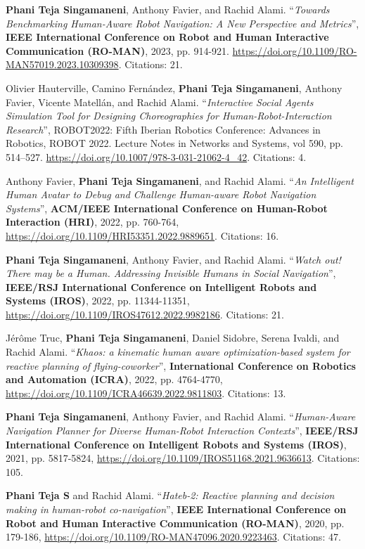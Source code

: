 \documentclass[11pt]{article}
\newcounter{descenum}
\newenvironment{descenumerate}[2]{%
  \setcounter{descenum}{#2}%
  \begin{enumerate}[
    topsep=0pt,
    itemsep=3pt,
    partopsep=0pt,
    parsep=0pt,
    label={[#1\arabic{descenum}]}
  ]
}{
  \end{enumerate}
}
\newcommand{\descitem}{%
  \item
  \addtocounter{descenum}{-1}
}
\newcommand{\bt}[1]{{\textbf{\color{teal} #1}}}
\begin{document}
\begin{descenumerate}{C}{22}
    \descitem \label{new_metrics} {\textbf{Phani Teja Singamaneni}, Anthony Favier, and Rachid Alami. ``\textit{Towards Benchmarking Human-Aware Robot Navigation: A New Perspective and Metrics}'', \bt{IEEE International Conference on Robot and Human Interactive Communication (RO-MAN)}, 2023, pp. 914-921. \url{https://doi.org/10.1109/RO-MAN57019.2023.10309398}.} Citations: 21.
    
    \descitem \label{imhus1} {Olivier Hauterville, Camino Fernández, \textbf{Phani Teja Singamaneni}, Anthony Favier, Vicente Matellán, and Rachid Alami. ``\textit{Interactive Social Agents Simulation Tool for Designing Choreographies for Human-Robot-Interaction Research}'', ROBOT2022: Fifth Iberian Robotics Conference: Advances in Robotics, ROBOT 2022. Lecture Notes in Networks and Systems, vol 590, pp. 514–527. \url{https://doi.org/10.1007/978-3-031-21062-4_42}.} Citations: 4.

    \descitem\label{inhus1} {Anthony Favier, \textbf{Phani Teja Singamaneni}, and Rachid Alami. ``\textit{An Intelligent Human Avatar to Debug and Challenge Human-aware Robot Navigation Systems}'', \bt{ACM/IEEE International Conference on Human-Robot Interaction (HRI)}, 2022, pp. 760-764, \url{https://doi.org/10.1109/HRI53351.2022.9889651}.} Citations: 16.
        
    \descitem \label{cohan3} {\textbf{Phani Teja Singamaneni}, Anthony Favier, and Rachid Alami. ``\textit{Watch out! There may be a Human. Addressing Invisible Humans in Social Navigation}'', \bt{IEEE/RSJ International Conference on Intelligent Robots and Systems (IROS)}, 2022, pp. 11344-11351, \url{https://doi.org/10.1109/IROS47612.2022.9982186}.} Citations: 21.
    
    \descitem {Jérôme Truc, \textbf{Phani Teja Singamaneni}, Daniel Sidobre, Serena Ivaldi, and Rachid Alami. ``\textit{Khaos: a kinematic human aware optimization-based system for reactive planning of flying-coworker}'', \bt{International Conference on Robotics and Automation (ICRA)}, 2022, pp. 4764-4770, \url{https://doi.org/10.1109/ICRA46639.2022.9811803}.} Citations: 13.
    
    \descitem \label{cohan2} {\textbf{Phani Teja Singamaneni}, Anthony Favier, and Rachid Alami. ``\textit{Human-Aware Navigation Planner for Diverse Human-Robot Interaction Contexts}'', \bt{IEEE/RSJ International Conference on Intelligent Robots and Systems (IROS)}, 2021, pp. 5817-5824, \url{https://doi.org/10.1109/IROS51168.2021.9636613}.} Citations: 105.

    \descitem \label{cohan1} {\textbf{Phani Teja S} and Rachid Alami. ``\textit{Hateb-2: Reactive planning and decision making in human-robot co-navigation}'', \bt{IEEE International Conference on Robot and Human Interactive Communication (RO-MAN)}, 2020, pp. 179-186, \url{https://doi.org/10.1109/RO-MAN47096.2020.9223463}.} Citations: 47.


\end{descenumerate}
\end{document}
